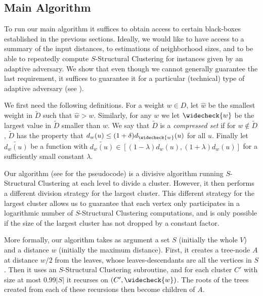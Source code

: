 \documentclass{article}
\begin{document}
\subsection{Main Algorithm}
\label{section:algorithm}

To run our main algorithm it suffices to obtain access to certain black-boxes established in the previous sections.
Ideally, we would like to have access to a summary of the input distances, to estimations of neighborhood sizes, and to be able to repeatedly compute $S$-Structural Clustering for instances given by an adaptive adversary.
We show that even though we cannot generally guarantee the last requirement, it suffices to guarantee it for a particular (technical) type of adaptive adversary (see ).

We first need the following definitions.
For a weight $w \in D$, let $\widehat{w}$ be the smallest weight in $\widetilde{D}$ such that $\widehat{w}>w$.
Similarly, for any $w$ we let $\widecheck{w}$ be the largest value in $\widetilde{D}$ smaller than $w$.
We say that $\widetilde{D}$ is a \emph{compressed set} if for $w\not \in \widetilde{D}$, $\widetilde{D}$ has the property that $d_w(u) \le (1+\delta) d_{\widecheck{w}}(u)$ for all $u$.
Finally let $\widetilde{d_w(u)}$ be a function with $\widetilde{d_w(u)}\in [(1-\lambda)d_w(u), (1+\lambda)d_w(u)]$ for a sufficiently small constant $\lambda$.

Our algorithm (see  for the pseudocode) is a divisive algorithm running $S$-Structural Clustering at each level to divide a cluster.
However, it then performs a different division strategy for the largest cluster.
This different strategy for the largest cluster allows us to guarantee that each vertex only participates in a logarithmic number of $S$-Structural Clustering computations, and is only possible if the size of the largest cluster has not dropped by a constant factor.

More formally, our algorithm takes as argument a set $S$ (initially the whole $V$) and a distance $w$ (initially the maximum distance).
First, it creates a tree-node $A$ at distance $w/2$ from the leaves, whose leaves-descendants are all the vertices in $S$.
Then it uses an $S$-Structural Clustering subroutine, and for each cluster $C'$ with size at most $0.99|S|$ it recurses on $(C',\widecheck{w})$.
The roots of the trees created from each of these recursions then become children of $A$.
\end{document}
